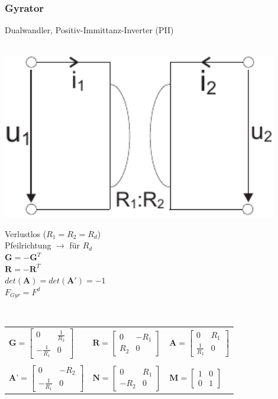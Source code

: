 \documentclass[a4paper,twocolumn,10pt]{article}
\begin{document}
\subsubsection*{Gyrator}
Dualwandler, Positiv-Immittanz-Inverter (PII)\\\\
\begin{minipage}[b]{0.2\textwidth}
\includegraphics[width=0.9\textwidth]{Grafiken/OP_Gyrator}
\end{minipage}
\hfill
\begin{minipage}[b]{0.26\textwidth}
Verlustlos ($R_1=R_2=R_d$)\\
Pfeilrichtung $\rightarrow$ für $R_d$\\
$\textbf{G}=-\textbf{G}^T$\\
$\textbf{R}=-\textbf{R}^T$\\
$det(\textbf{A})=det(\textbf{A}')=-1$\\
$F_{Gyr}=F^d$
\end{minipage}\\

\begin{tabular}{lll}
$\textbf{G}=\begin{bmatrix}0 & \frac{1}{R_2}\\ -\frac{1}{R_1} & 0\end{bmatrix}$ & $\textbf{R}=\begin{bmatrix}0 & -R_1\\ R_2 & 0\end{bmatrix}$ & $\textbf{A}=\begin{bmatrix}0 & R_1\\ \frac{1}{R_2} & 0\end{bmatrix}$\\\\
$\textbf{A'}=\begin{bmatrix}0 & -R_2\\ -\frac{1}{R_1} & 0\end{bmatrix}$ & $\textbf{N}=\begin{bmatrix}0 & R_1\\ -R_2 & 0\end{bmatrix}$ & $\textbf{M}=\begin{bmatrix}1 & 0\\ 0 & 1\end{bmatrix}$
\end{tabular}
\end{document}
